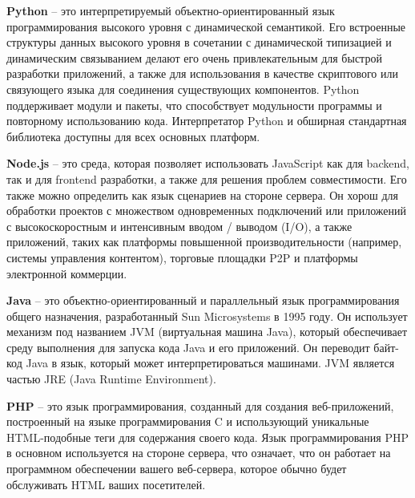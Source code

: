 \textbf{Python} – это интерпретируемый объектно-ориентированный язык программирования высокого уровня с динамической семантикой. Его встроенные структуры данных высокого уровня в сочетании с динамической типизацией и динамическим связыванием делают его очень привлекательным для быстрой разработки приложений, а также для использования в качестве скриптового или связующего языка для соединения существующих компонентов. Python поддерживает модули и пакеты, что способствует модульности программы и повторному использованию кода. Интерпретатор Python и обширная стандартная библиотека доступны для всех основных платформ.

\textbf{Node.js} – это среда, которая позволяет использовать JavaScript как для backend, так и для frontend разработки, а также для решения проблем совместимости. Его также можно определить как язык сценариев на стороне сервера. Он хорош для обработки проектов с множеством одновременных подключений или приложений с высокоскоростным и интенсивным вводом / выводом (I/O), а также приложений, таких как платформы повышенной производительности (например, системы управления контентом), торговые площадки P2P и платформы электронной коммерции.

\textbf{Java} – это объектно-ориентированный и параллельный язык программирования общего назначения, разработанный Sun Microsystems в 1995 году. Он использует механизм под названием JVM (виртуальная машина Java), который обеспечивает среду выполнения для запуска кода Java и его приложений. Он переводит байт-код Java в язык, который может интерпретироваться машинами. JVM является частью JRE (Java Runtime Environment).

\textbf{PHP} – это язык программирования, созданный для создания веб-приложений, построенный на языке программирования C и использующий уникальные HTML-подобные теги для содержания своего кода. Язык программирования PHP в основном используется на стороне сервера, что означает, что он работает на программном обеспечении вашего веб-сервера, которое обычно будет обслуживать HTML ваших посетителей.


